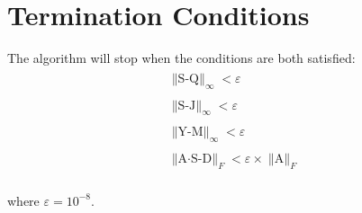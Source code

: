 \documentclass{article}
\begin{document}
\section{Termination Conditions}
The algorithm will stop when the conditions are both satisfied:
\begin{eqnarray}
\begin{array}{l}
\mathop{\parallel S-Q \parallel}_\infty < \varepsilon \\\\
\mathop{\parallel S-J \parallel}_\infty < \varepsilon \\\\
\mathop{\parallel Y-M \parallel}_\infty < \varepsilon \\\\
\mathop{\parallel A\cdot S-D \parallel}_F < \varepsilon \times \mathop{\parallel A \parallel}_F
\end{array}
\end{eqnarray}\\
where $\varepsilon = 10^{-8}$.\\
\end{document}
